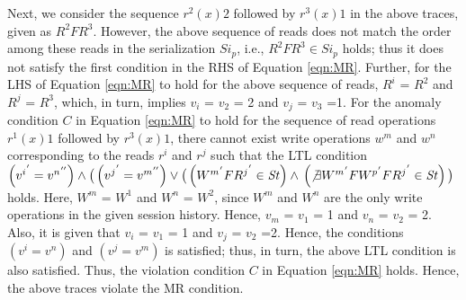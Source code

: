 \documentclass{sig-alternate-05-2015}
\begin{document}
   Next, we consider the sequence $r^2(x){2}$ followed by $r^3(x){1}$ in the above traces, given
  as $R^2 F R^3$. However, the above sequence of reads does not match the order among these reads in the serialization  $\mathit{Si}_p$, i.e.,
  $R^2 F R^3 \in \mathit{Si}_p$ holds;
    thus it does not satisfy the first condition in the RHS of Equation \ref{eqn:MR}.
    Further, for the LHS of Equation \ref{eqn:MR} to hold for the above sequence of reads,   $R^i$ = $R^2$ and $R^j$ = $R^3$,
   which, in turn, implies $v_i$ = $v_2$ = 2 and $v_j$ = $v_3$ =1.
   For the anomaly condition $C$ in Equation \ref{eqn:MR} to hold for the sequence of read operations $r^1(x){1}$ followed by $r^3(x){1}$, there cannot exist write
  operations $w^m$ and $w^n$ corresponding to the reads $r^i$ and $r^j$  such that the LTL condition
  $\left( {v^i}^{'} = {v^n}^{''} \right) \wedge \big( \left( {v^j}^{'} = {v^m}^{''} \right) \vee \big( \left( {W^m}^{'} F {R^j}^{'} \in \mathit{St} \right) \wedge \\ \left( \not\exists {W^m}^{'} F {W^p}^{'} F {R^j}^{'} \in \mathit{St} \right) \big)$ holds.
   Here, $W^m$ = $W^1$ and $W^n$ = $W^2$, since $W^m$ and $W^n$ are the only write operations in the given session history.
   Hence, $v_m$ = $v_1$ = 1 and $v_n$ = $v_2$ = 2. Also, it is given that
  $v_i$ = $v_1$ = 1 and $v_j$ = $v_2$ =2. Hence, the conditions $\left( v^i = v^n \right)$ and $ \left( v^j = v^m \right)$
  is satisfied; thus, in turn, the above LTL condition is also satisfied. Thus, the violation condition $C$
  in Equation \ref{eqn:MR} holds.
    Hence, the above traces violate the MR condition.
\end{document}
